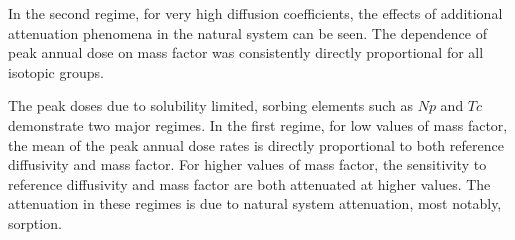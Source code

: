 In the second regime, for very high diffusion coefficients, the effects of 
additional attenuation phenomena in the natural system can be seen.  The 
dependence of peak annual dose on mass factor was consistently directly 
proportional for all isotopic groups.

The peak doses due to solubility limited, sorbing elements such as $Np$ and 
$Tc$ demonstrate two major regimes. In the first regime, for 
low values of mass factor, the mean of the peak annual dose rates is directly 
proportional to both reference diffusivity and mass factor.  For higher values 
of mass factor, the sensitivity to reference diffusivity and mass factor are 
both attenuated at higher values.  The attenuation in these regimes 
is due to natural system attenuation, most notably, sorption.

%
%
